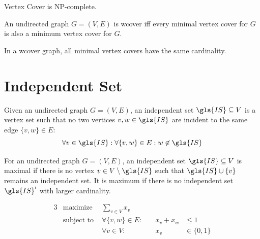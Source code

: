 
\begin{theorem}
  Vertex Cover is NP-complete. \cite{karp_np_complete}
\end{theorem}


\begin{definition}
  \label{def:well_covered}
  An undirected graph \(G=(V,E)\) is \gls{wcover} iff every minimal
  vertex cover for \(G\) is also a minimum vertex cover for \(G\).
  \cite{graph_well_covered}
\end{definition}


\begin{theorem}
  \label{thm:well_covered_vertex_cover}
  In a \gls{wcover} graph, all minimal vertex covers have the same
  cardinality. \cite{graph_well_covered}
\end{theorem}

\section{Independent Set}


\begin{definition}
  Given an undirected graph \(G=(V,E)\), an independent set
  \(\gls{IS} \subseteq V\) is a vertex set such that no two
  vertices \(v,w \in \gls{IS}\) are incident to the same edge 
  \(\{v,w\} \in E\):
  \[
    \forall v \in \gls{IS}:
    \forall \{v,w\} \in E:
    w \not\in \gls{IS}
  \]
\end{definition}


\begin{definition}
  For an undirected graph \(G=(V,E)\), an independent set
  \(\gls{IS}\subseteq V\) is maximal if there is no vertex
  \(v \in V\setminus \gls{IS}\) such that
  \(\gls{IS} \cup \{v\}\) remains an independent set. It is
  maximum if there is no independent set \(\gls{IS}'\) with
  larger cardinality.
\end{definition}


\begin{problem}
  \begin{alignat*}{3}
    &\text{maximize } & \sum\limits_{v \in V} x_v \\
    &\text{subject to } & \forall \{v,w\} \in E : &~& x_v + x_w &\leq 1 \\
    && \forall v \in V : &~& x_v &\in \{0,1\}
  \end{alignat*}
\end{problem}

